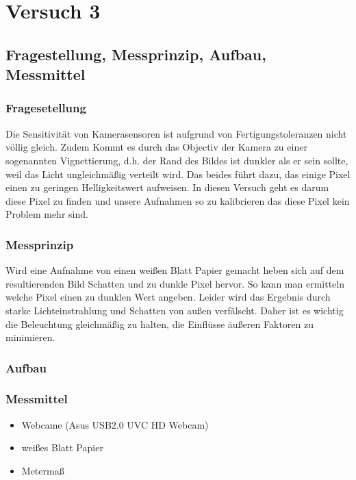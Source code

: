 \chapter{Versuch 3}
\label{chap:VERSUCH_3}

\section{Fragestellung, Messprinzip, Aufbau, Messmittel}
\label{chap:VERSUCH_3_FRAGESTELLUNG}

\subsection*{Fragesetellung}

Die Sensitivität von Kamerasensoren ist aufgrund von Fertigungstoleranzen nicht völlig gleich.
Zudem Kommt es durch das Objectiv der Kamera zu einer sogenannten Vignettierung, d.h. der Rand des Bildes ist dunkler als er sein sollte, weil das Licht ungleichmäßig verteilt wird.
Das beides führt dazu, das einige Pixel einen zu geringen Helligkeitswert aufweisen.
In diesen Versuch geht es darum diese Pixel zu finden und unsere Aufnahmen so zu kalibrieren das diese Pixel kein Problem mehr sind.

\subsection*{Messprinzip}
Wird eine Aufnahme von einen weißen Blatt Papier gemacht heben sich auf dem resultierenden Bild Schatten und zu dunkle Pixel hervor.
So kann man ermitteln welche Pixel einen zu dunklen Wert angeben.
Leider wird das Ergebnis durch starke Lichteinstrahlung und Schatten von außen verfälscht.
Daher ist es wichtig die Beleuchtung gleichmäßig zu halten, die Einflüsse äußeren Faktoren zu minimieren.

\subsection*{Aufbau}



\subsection{Messmittel}
\begin{itemize}
\item Webcame (Asus USB2.0 UVC HD Webcam)
\item weißes Blatt Papier
\item Metermaß
\end{itemize}


